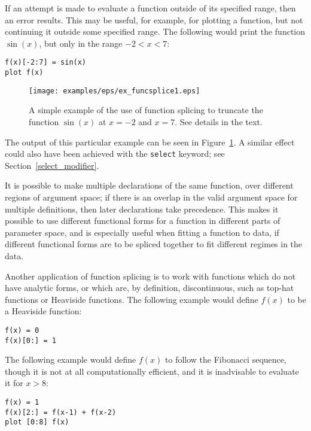 If an attempt is made to evaluate a function outside of its specified range,
then an error results. This may be useful, for example, for plotting a
function, but not continuing it outside some specified range. The following
would print the function $\sin(x)$, but only in the range $-2<x<7$:

\begin{verbatim}
f(x)[-2:7] = sin(x)
plot f(x)
\end{verbatim}

\begin{figure}
\begin{center}
\texttt{[image: examples/eps/ex\_funcsplice1.eps]}
\end{center}
\caption{A simple example of the use of function splicing to truncate the function $\sin(x)$ at $x=-2$ and $x=7$. See details in the text.}
\label{fig:ex_funcsplice1}
\end{figure}

\label{splice} \noindent The output of this particular example can be seen in
Figure~\ref{fig:ex_funcsplice1}. A similar effect could also have been achieved
with the \texttt{select} keyword; see Section~\ref{select_modifier}.

It is possible to make multiple declarations of the same function, over
different regions of argument space; if there is an overlap in the valid
argument space for multiple definitions, then later declarations take
precedence. This makes it possible to use different functional forms for a
function in different parts of parameter space, and is especially useful when
fitting a function to data, if different functional forms are to be spliced
together to fit different regimes in the data.

Another application of function splicing is to work with functions which do not
have analytic forms, or which are, by definition, discontinuous, such as
top-hat functions or Heaviside functions. The following example would define
$f(x)$ to be a Heaviside function:

\begin{verbatim}
f(x) = 0
f(x)[0:] = 1
\end{verbatim}

\noindent The following example would define $f(x)$ to follow the Fibonacci
sequence, though it is not at all computationally efficient, and it is
inadvisable to evaluate it for $x>8$:

\begin{verbatim}
f(x) = 1
f(x)[2:] = f(x-1) + f(x-2)
plot [0:8] f(x)
\end{verbatim}

